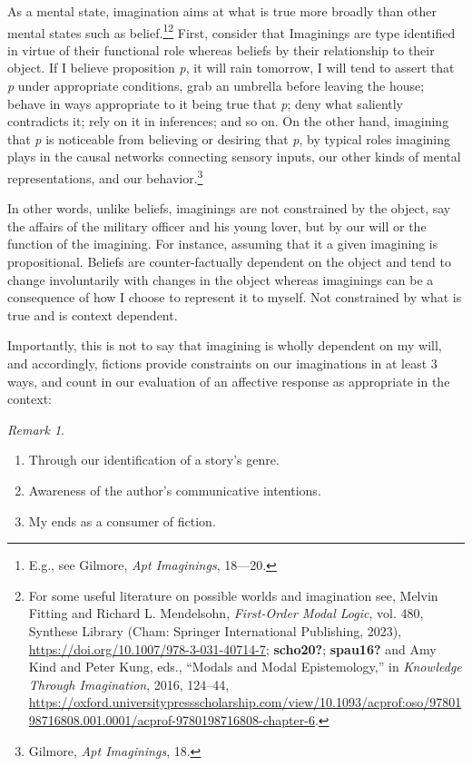 \documentclass[phdthesis,12pt,final]{wuthesis}
\theoremstyle{definition}
\theoremstyle{definition}
\theoremstyle{definition}
\theoremstyle{definition}
\theoremstyle{remark}
\newtheorem*{remark}{Remark}
\begin{document}
As a mental state, imagination aims at what is true more broadly than other mental states such as belief.\footnote{E.g., see Gilmore, \emph{Apt {Imaginings}}, 18---20.}\footnote{For some useful literature on possible worlds and imagination see, Melvin Fitting and Richard L. Mendelsohn, \emph{First-{Order Modal Logic}}, vol. 480, Synthese {Library} (Cham: Springer International Publishing, 2023), \url{https://doi.org/10.1007/978-3-031-40714-7}; \textbf{scho20?}; \textbf{spau16?} and Amy Kind and Peter Kung, eds., {``Modals and {Modal Epistemology},''} in \emph{Knowledge {Through Imagination}}, 2016, 124--44, \url{https://oxford.universitypressscholarship.com/view/10.1093/acprof:oso/9780198716808.001.0001/acprof-9780198716808-chapter-6}.} First, consider that Imaginings are type identified in virtue of their functional role whereas beliefs by their relationship to their object. If I believe proposition \emph{p}, it will rain tomorrow, I will tend to assert that \emph{p} under appropriate conditions, grab an umbrella before leaving the house; behave in ways appropriate to it being true that \emph{p}; deny what saliently contradicts it; rely on it in inferences; and so on. On the other hand, imagining that \emph{p} is noticeable from believing or desiring that \emph{p}, by typical roles imagining plays in the causal networks connecting sensory inputs, our other kinds of mental representations, and our behavior.\footnote{Gilmore, \emph{Apt {Imaginings}}, 18.}

In other words, unlike beliefs, imaginings are not constrained by the object, say the affairs of the military officer and his young lover, but by our will or the function of the imagining. For instance, assuming that it a given imagining is propositional. Beliefs are counter-factually dependent on the object and tend to change involuntarily with changes in the object whereas imaginings can be a consequence of how I choose to represent it to myself. Not constrained by what is true and is context dependent.

Importantly, this is not to say that imagining is wholly dependent on my will, and accordingly, fictions provide constraints on our imaginations in at least 3 ways, and count in our evaluation of an affective response as appropriate in the context:

\begin{remark}
\leavevmode

\begin{enumerate}
\def\labelenumi{\arabic{enumi}.}
\tightlist
\item
  Through our identification of a story's genre.
\item
  Awareness of the author's communicative intentions.
\item
  My ends as a consumer of fiction.
\end{enumerate}

\end{remark}
\end{document}
